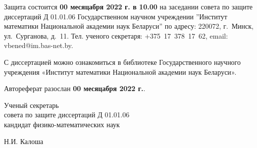 \documentclass[_00_autoref.tex]{subfiles}
\begin{document}


\medskip

Защита состоится \textbf{00 месяцабря 2022 г. в 10.00} на заседании совета по защите диссертаций Д 01.01.06 Государственном научном учреждении ''Институт математики Национальной академии наук Беларуси'' по адресу: 220072, г.~Минск, ул.~Сурганова, д.~11. Тел. ученого секретаря: +375~17~378~17~62, email: vbened@im.bas-net.by. 

\medskip

С диссертацией можно ознакомиться в библиотеке Государственного научного учреждения «Институт математики Национальной академии наук Беларуси».

\medskip
\noindent
Автореферат разослан \textbf{00 месяцабря 2022 г.}.\\

\vfill
\noindent
\begin{minipage}[b]{0.6\textwidth}
\begin{flushleft}
Ученый секретарь \\
совета по защите диссертаций Д 01.01.06 \\
кандидат физико-математических наук
\end{flushleft}
\end{minipage}
\begin{minipage}[b]{0.39\textwidth}
\begin{flushright}
Н.И. Калоша 
\end{flushright}
\end{minipage}
\eject

\pagestyle{plain}
\setcounter{page}{1}
\setlength{\voffset}{-8mm}
\end{document}
